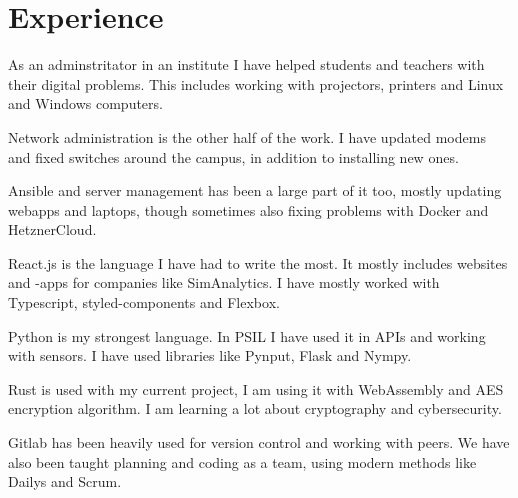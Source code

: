 \documentclass[]{plushcv}
\begin{document}
\begin{minipage}[t]{0.70\textwidth} 



\section{Experience}
\vspace{\topsep} %
\begin{tightemize}
\sectionsep
\item As an adminstritator in an institute I have helped students and teachers with their digital problems. This includes working with projectors, printers and Linux and Windows computers.
\item Network administration is the other half of the work. I have updated modems and fixed switches around the campus, in addition to installing new ones.
\item Ansible and server management has been a large part of it too, mostly updating webapps and laptops, though sometimes also fixing problems with Docker and HetznerCloud.
\end{tightemize}
\sectionsep

\begin{tightemize}
\sectionsep
\item React.js is the language I have had to write the most. It mostly includes websites
and -apps for companies like SimAnalytics. I have mostly worked with Typescript, styled-components and Flexbox.
\item Python is my strongest language. In PSIL I have used it in APIs and working with
sensors. I have used libraries like Pynput, Flask and Nympy.
\item Rust is used with my current project, I am using it with WebAssembly and AES
encryption algorithm. I am learning a lot about cryptography and cybersecurity.
\item Gitlab has been heavily used for version control and working with peers. We have also been taught planning and coding as a team, using modern methods like Dailys and Scrum.
\end{tightemize}
\sectionsep


\end{minipage}
\end{document}
